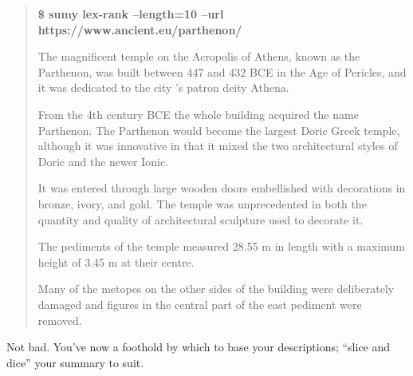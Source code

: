 \begin{quote}
  \small{
\noindent \textbf{\$ sumy lex-rank --length=10 --url https://www.ancient.eu/parthenon/}

\noindent The magnificent temple on the Acropolis of Athens, known as the Parthenon, was built between 447 and 432 BCE in the Age of Pericles, and it was dedicated to the city ’s patron deity Athena.

From the 4th century BCE the whole building acquired the name Parthenon. The Parthenon would become the largest Doric Greek temple, although it was innovative in that it mixed the two architectural styles of Doric and the newer Ionic.

It was entered through large wooden doors embellished with decorations in bronze, ivory, and gold. The temple was unprecedented in both the quantity and quality of architectural sculpture used to decorate it.

The pediments of the temple measured 28.55 m in length with a maximum height of 3.45 m at their centre.

Many of the metopes on the other sides of the building were deliberately damaged and figures in the central part of the east pediment were removed.
} %
\end{quote}
\noindent Not bad. You've now a foothold by which to base your descriptions;
``slice and dice'' your summary to suit.

